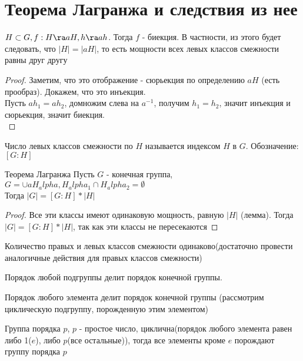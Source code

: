 \section{Теорема Лагранжа и следствия из нее}
\begin{lemma}
	$H \subset G, f: H \ra aH, h \ra ah$. Тогда $f$ - биекция. В частности, из этого будет следовать, что $|H| = |aH|$, то есть мощности всех левых классов смежности равны друг другу \\	
\end{lemma} 
\begin{proof}
	Заметим, что это отображение - сюрьекция по определению $aH$ (есть прообраз). Докажем, что это инъекция.  \\
	Пусть $ah_1 = ah_2$, домножим слева на $a^{-1}$, получим $h_1 = h_2$, значит инъекция и сюрьекция, значит биекция. \\
\end{proof}


\begin{Def}
	Число левых классов смежности по $H$ называется индексом $H$ в $G$. Обозначение: $[G:H]$
\end{Def}

\begin{theorem}{Теорема Лагранжа}
	Пусть $G$ - конечная группа, $G = \cup aH_alpha, H_alpha_1 \cap H_alpha_2 = \emptyset$ \\
	Тогда $|G| = [G : H] * |H|$                                                                                                    \\
\end{theorem}
\begin{proof}
	Все эти классы имеют одинаковую мощность, равную $|H|$ (лемма). Тогда $|G| = [G : H] * |H|$, так как эти классы не пересекаются
\end{proof}
\begin{conseq}
	Количество правых и левых классов смежности одинаково(достаточно провести аналогичные действия для правых классов смежности)
\end{conseq}
\begin{conseq}
	Порядок любой подгруппы делит порядок конечной группы.
\end{conseq}
\begin{conseq}
	Порядок любого элемента делит порядок конечной группы (рассмотрим циклическую подгруппу, порожденную этим элементом)
\end{conseq}
\begin{conseq}
	Группа порядка $p$, $p$ - простое число, циклична(порядок любого элемента равен либо 1($e$), либо $p$(все остальные)), тогда все элементы кроме $e$ порождают группу порядка $p$ 
\end{conseq}